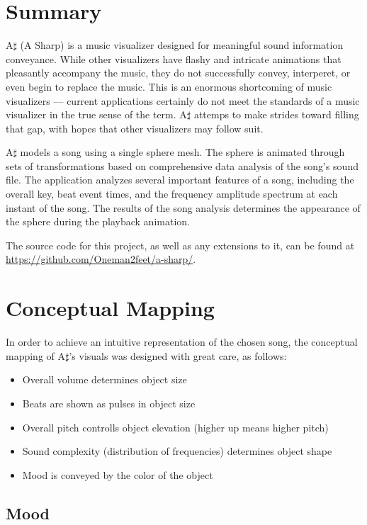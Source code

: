 \documentclass{article}
\begin{document}
\section{Summary}

A$\sharp$ (A Sharp) is a music visualizer designed for meaningful sound information conveyance. While other visualizers have flashy and intricate animations that pleasantly accompany the music, they do not successfully convey, interperet, or even begin to replace the music. This is an enormous shortcoming of music visualizers --- current applications certainly do not meet the standards of a music visualizer in the true sense of the term. A$\sharp$ attemps to make strides toward filling that gap, with hopes that other visualizers may follow suit.

A$\sharp$ models a song using a single sphere mesh. The sphere is animated through sets of transformations based on comprehensive data analysis of the song's sound file. The application analyzes several important features of a song, including the overall key, beat event times, and the frequency amplitude spectrum at each instant of the song. The results of the song analysis determines the appearance of the sphere during the playback animation.

The source code for this project, as well as any extensions to it, can be found at \url{https://github.com/Oneman2feet/a-sharp/}.

\section{Conceptual Mapping}

In order to achieve an intuitive representation of the chosen song, the conceptual mapping of A$\sharp$'s visuals was designed with great care, as follows:

\begin{itemize}
    \item Overall volume determines object size
    \item Beats are shown as pulses in object size
    \item Overall pitch controlls object elevation (higher up means higher pitch)
    \item Sound complexity (distribution of frequencies) determines object shape
    \item Mood is conveyed by the color of the object
\end{itemize}

\subsection{Mood}
\end{document}
